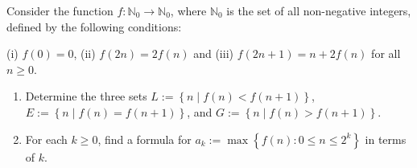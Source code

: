 Consider the function $f:\mathbb{N}_0\to\mathbb{N}_0$, where $\mathbb{N}_0$ is the set of all non-negative integers, defined by the following conditions:

\begin{center}
	(i) $f\left(0\right)=0$, (ii) $f\left(2n\right)=2f\left(n\right)$ and (iii) $f\left(2n+1\right)=n+2f\left(n\right)$ for all $n\geq0$.
\end{center}

\begin{enumerate}[label=(\alph*)]
	\item Determine the three sets $L:=\left\{n\mid f\left(n\right)<f\left(n+1\right)\right\}$, $E:=\left\{n\mid f\left(n\right)=f\left(n+1\right)\right\}$, and $G:=\left\{n\mid f\left(n\right)>f\left(n+1\right)\right\}$.
	\item For each $k\geq0$, find a formula for $a_k:=\max\left\{f\left(n\right):0\leq n\leq2^k\right\}$ in terms of $k$.
\end{enumerate}